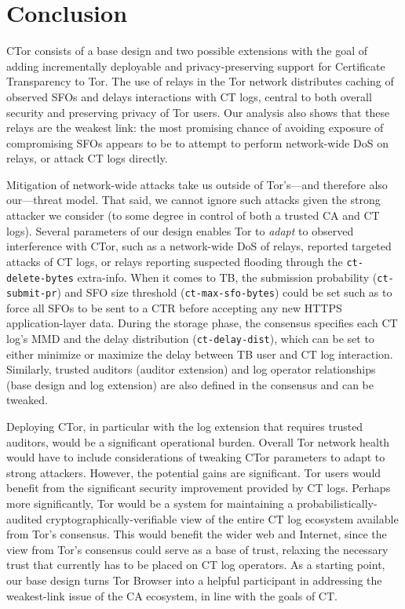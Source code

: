 \section{Conclusion} \label{sec:conclusion}
CTor consists of a base design and two possible extensions with the goal of
adding incrementally deployable and privacy-preserving support for Certificate
Transparency to Tor. The use of relays in the Tor network distributes caching of
observed SFOs and delays interactions with CT logs, central to both overall
security and preserving privacy of Tor users. Our analysis also shows that these
relays are the weakest link: the most promising chance of avoiding exposure of
compromising SFOs appears to be to attempt to perform network-wide DoS on
relays, or attack CT logs directly. 

Mitigation of network-wide attacks take us outside of Tor's---and therefore also
our---threat model. That said, we cannot ignore such attacks given the strong
attacker we consider (to some degree in control of both a trusted CA and CT
logs). Several parameters of our design enables Tor to \emph{adapt} to observed
interference with CTor, such as a network-wide DoS of relays, reported targeted
attacks of CT logs, or relays reporting suspected flooding through the
\texttt{ct-delete-bytes}  extra-info. When it comes to TB, the submission
probability (\texttt{ct-submit-pr}) and SFO size threshold
(\texttt{ct-max-sfo-bytes}) could be set such as to force all SFOs to be sent to
a CTR before accepting any new HTTPS application-layer data. During the storage
phase, the consensus specifies each CT log's MMD and the delay distribution
(\texttt{ct-delay-dist}), which can be set to either minimize or maximize the
delay between TB user and CT log interaction. Similarly, trusted auditors
(auditor extension) and log operator relationships (base design and log
extension) are also defined in the consensus and can be tweaked.

Deploying CTor, in particular with the log extension that requires trusted
auditors, would be a significant operational burden. Overall Tor network health
would have to include considerations of tweaking CTor parameters to adapt to
strong attackers. However, the potential gains are significant. Tor users would
benefit from the significant security improvement provided by CT logs. Perhaps
more significantly, Tor would be a system for maintaining a
probabilistically-audited cryptographically-verifiable view of the entire CT log
ecosystem available from Tor’s consensus. This would benefit the wider web and
Internet, since the view from Tor's consensus could serve as a base of trust,
relaxing the necessary trust that currently has to be placed on CT log
operators. As a starting point, our base design turns Tor Browser into a helpful
participant in addressing the weakest-link issue of the CA ecosystem, in line
with the goals of CT.
